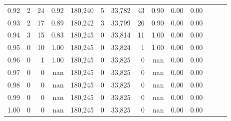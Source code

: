 \begin{tabular}{rrrrrrrrrrrrrr}
0.92 &       2 &   24 &  0.92 &  180,240 &        5 &  33,782 &      43 &  0.90 &  0.00 &      0.00 \\
0.93 &       2 &   17 &  0.89 &  180,242 &        3 &  33,799 &      26 &  0.90 &  0.00 &      0.00 \\
0.94 &       3 &   15 &  0.83 &  180,245 &        0 &  33,814 &      11 &  1.00 &  0.00 &      0.00 \\
0.95 &       0 &   10 &  1.00 &  180,245 &        0 &  33,824 &       1 &  1.00 &  0.00 &      0.00 \\
0.96 &       0 &    1 &  1.00 &  180,245 &        0 &  33,825 &       0 &   nan &  0.00 &      0.00 \\
0.97 &       0 &    0 &   nan &  180,245 &        0 &  33,825 &       0 &   nan &  0.00 &      0.00 \\
0.98 &       0 &    0 &   nan &  180,245 &        0 &  33,825 &       0 &   nan &  0.00 &      0.00 \\
0.99 &       0 &    0 &   nan &  180,245 &        0 &  33,825 &       0 &   nan &  0.00 &      0.00 \\
1.00 &       0 &    0 &   nan &  180,245 &        0 &  33,825 &       0 &   nan &  0.00 &      0.00 \\
\bottomrule
\end{tabular}
